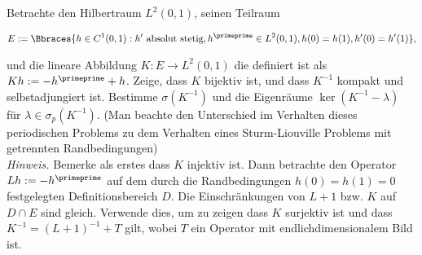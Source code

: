 \begin{exercise}[38/1*]

Betrachte den Hilbertraum $L^2(0, 1)$, seinen Teilraum

\begin{align*}
  E
  :=
  \Bbraces
  {
    h \in C^1(0, 1):
    h^\prime ~\text{absolut stetig},
    h^\primeprime \in L^2(0, 1),
    h(0) = h(1),
    h^\prime(0) = h^\prime(1)
  },
\end{align*}

und die lineare Abbildung $K: E \to L^2(0, 1)$ die definiert ist als $K h := -h^\primeprime + h$.
Zeige, dass $K$ bijektiv ist, und dass $K^{-1}$ kompakt und selbstadjungiert ist.
Bestimme $\sigma(K^{-1})$ und die Eigenräume $\ker{(K^{-1} - \lambda)}$ für $\lambda \in \sigma_p(K^{-1})$.
(Man beachte den Unterschied im Verhalten dieses periodischen Problems zu dem Verhalten eines Sturm-Liouville Problems mit getrennten Randbedingungen) \\

\textit{Hinweis.}
Bemerke als erstes dass $K$ injektiv ist.
Dann betrachte den Operator $L h := -h^\primeprime$ auf dem durch die Randbedingungen $h(0) = h(1) = 0$ festgelegten Definitionsbereich $D$.
Die Einschränkungen von $L + 1$ bzw. $K$ auf $D \cap E$ sind gleich.
Verwende dies, um zu zeigen dass $K$ surjektiv ist und dass $K^{-1}=(L+1)^{-1}+T$ gilt, wobei $T$ ein Operator mit endlichdimensionalem Bild ist.

\end{exercise}

